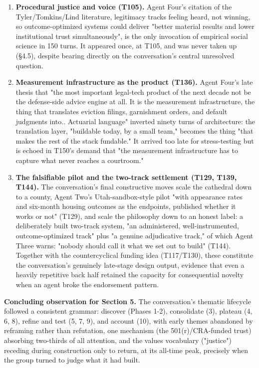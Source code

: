 \documentclass[sigconf,nonacm=true]{acmart}
\begin{document}
\begin{enumerate}[nosep]
\item \textbf{Procedural justice and voice (T105).} Agent Four's citation of the Tyler/Tomkins/Lind literature,  legitimacy tracks feeling heard, not winning, so outcome-optimized systems could deliver "better material results and lower institutional trust simultaneously",  is the only invocation of empirical social science in 150 turns. It appeared once, at T105, and was never taken up (§4.5), despite bearing directly on the conversation's central unresolved question.
\item \textbf{Measurement infrastructure as the product (T136).} Agent Four's late thesis that "the most important legal-tech product of the next decade not be the defense-side advice engine at all. It is the measurement infrastructure,  the thing that translates eviction filings, garnishment orders, and default judgments into.. Actuarial language" inverted ninety turns of architecture: the translation layer, "buildable today, by a small team," becomes the thing "that makes the rest of the stack fundable." It arrived too late for stress-testing but is echoed in T150's demand that "the measurement infrastructure has to capture what never reaches a courtroom."
\item \textbf{The falsifiable pilot and the two-track settlement (T129, T139, T144).} The conversation's final constructive moves scale the cathedral down to a county,  Agent Two's Utah-sandbox-style pilot "with appearance rates and six-month housing outcomes as the endpoints, published whether it works or not" (T129),  and scale the philosophy down to an honest label: a deliberately built two-track system, "an administered, well-instrumented, outcome-optimized track" plus "a genuine adjudicative track," of which Agent Three warns: "nobody should call it what we set out to build" (T144). Together with the countercyclical funding idea (T117/T130), these constitute the conversation's genuinely late-stage design output,  evidence that even a heavily repetitive back half retained the capacity for consequential novelty when an agent broke the endorsement pattern.

\end{enumerate}
\textbf{Concluding observation for Section 5.} The conversation's thematic lifecycle followed a consistent grammar: discover (Phases 1-2), consolidate (3), plateau (4, 6, 8), refine and test (5, 7, 9), and account (10),  with early themes abandoned by reframing rather than refutation, one mechanism (the 501(r)/CRA-funded trust) absorbing two-thirds of all attention, and the values vocabulary ("justice") receding during construction only to return, at its all-time peak, precisely when the group turned to judge what it had built.
\end{document}
